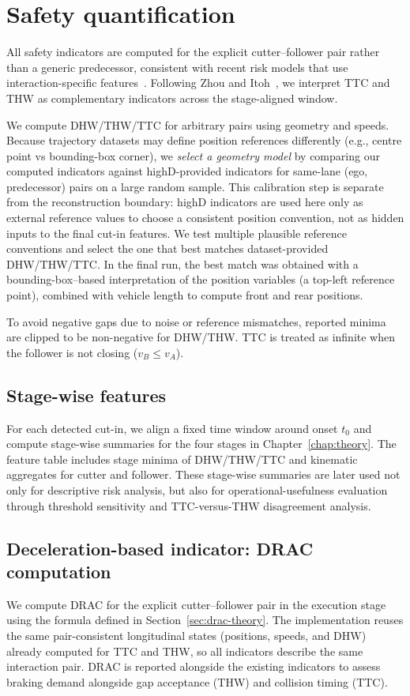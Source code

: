 \documentclass[12pt,a4paper,twoside,openright]{report}
\begin{document}
    \section{Safety quantification}
    All safety indicators are computed for the explicit cutter--follower pair rather than a generic predecessor, consistent with recent risk models that use interaction-specific features~\cite{shangguan2022,liu2025multitask}. Following Zhou and Itoh~\cite{zhou2016riskperception}, we interpret TTC and THW as complementary indicators across the stage-aligned window.

    We compute DHW/THW/TTC for arbitrary pairs using geometry and speeds. Because trajectory datasets may define position references differently (e.g., centre point vs bounding-box corner), we \emph{select a geometry model} by comparing our computed indicators against highD-provided indicators for same-lane (ego, predecessor) pairs on a large random sample. This calibration step is separate from the reconstruction boundary: highD indicators are used here only as external reference values to choose a consistent position convention, not as hidden inputs to the final cut-in features. We test multiple plausible reference conventions and select the one that best matches dataset-provided DHW/THW/TTC. In the final run, the best match was obtained with a bounding-box--based interpretation of the position variables (a top-left reference point), combined with vehicle length to compute front and rear positions.

    To avoid negative gaps due to noise or reference mismatches, reported minima are clipped to be non-negative for DHW/THW. TTC is treated as infinite when the follower is not closing ($v_B \leq v_A$).

    \subsection{Stage-wise features}
    For each detected cut-in, we align a fixed time window around onset $t_0$ and compute stage-wise summaries for the four stages in Chapter~\ref{chap:theory}. The feature table includes stage minima of DHW/THW/TTC and kinematic aggregates for cutter and follower. These stage-wise summaries are later used not only for descriptive risk analysis, but also for operational-usefulness evaluation through threshold sensitivity and TTC-versus-THW disagreement analysis.

    \subsection{Deceleration-based indicator: DRAC computation}
    \label{sec:drac-method}
    We compute DRAC for the explicit cutter--follower pair in the execution stage using the formula defined in Section~\ref{sec:drac-theory}. The implementation reuses the same pair-consistent longitudinal states (positions, speeds, and DHW) already computed for TTC and THW, so all indicators describe the same interaction pair. DRAC is reported alongside the existing indicators to assess braking demand alongside gap acceptance (THW) and collision timing (TTC).
\end{document}
